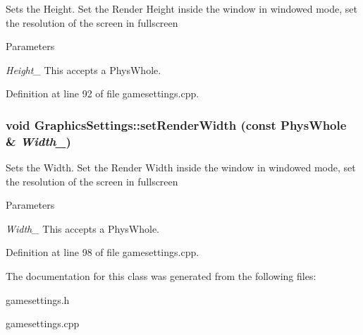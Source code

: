 Sets the Height. Set the Render Height inside the window in windowed mode, set the resolution of the screen in fullscreen 
\begin{DoxyParams}{Parameters}
\item[{\em Height\_\-}]This accepts a PhysWhole. \end{DoxyParams}


Definition at line 92 of file gamesettings.cpp.\hypertarget{classGraphicsSettings_a67fa224f5904030ccc24e711d1752f62}{
\subsubsection[{setRenderWidth}]{\setlength{\rightskip}{0pt plus 5cm}void GraphicsSettings::setRenderWidth (const PhysWhole \& {\em Width\_\-})}}
\label{de/de6/classGraphicsSettings_a67fa224f5904030ccc24e711d1752f62}


Sets the Width. Set the Render Width inside the window in windowed mode, set the resolution of the screen in fullscreen 
\begin{DoxyParams}{Parameters}
\item[{\em Width\_\-}]This accepts a PhysWhole. \end{DoxyParams}


Definition at line 98 of file gamesettings.cpp.

The documentation for this class was generated from the following files:\begin{DoxyCompactItemize}
\item 
gamesettings.h\item 
gamesettings.cpp\end{DoxyCompactItemize}
